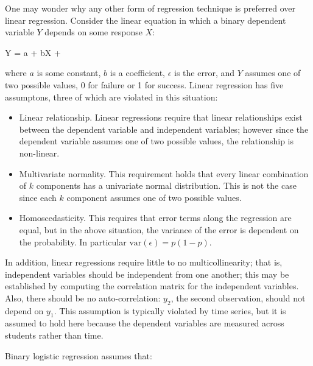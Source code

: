 One may wonder why any other form of regression technique is preferred over
linear regression.  Consider the linear equation in which a binary dependent
variable $Y$ depends on some response $X$:

\begin{equations}
         Y = a + bX + \epsilon
\end{equations}

where $a$ is some constant, $b$ is a coefficient, $\epsilon$ is the error, and
$Y$ assumes one of two possible values, 0 for failure or 1 for success.  Linear
regression has five assumptons, three of which are violated in this situation:

\begin{itemize}

  \item Linear relationship. Linear regressions require that linear
  relationships exist between the dependent variable and independent variables;
  however since the dependent variable assumes one of two possible values, the
  relationship is non-linear.

  \item Multivariate normality. This requirement holds that every linear
  combination of $k$ components has a univariate normal distribution.  This
  is not the case since each $k$ component assumes one of two possible values.

  \item Homoscedasticity. This requires that error terms along the regression
  are equal, but in the above situation, the variance of the error is dependent
  on the probability.   In particular $\mathrm{var}(\epsilon) = p(1-p)$.

\end{itemize} 

In addition, linear regressions require little to no multicollinearity; that
is, independent variables should be independent from one another; this may be
established by computing the correlation matrix for the independent variables.
Also, there should be no auto-correlation: $y_2$, the second observation,
should not depend on $y_1$.  This assumption is typically violated by time
series, but it is assumed to hold here because the dependent variables are
measured across students rather than time.  

Binary logistic regression assumes that:

